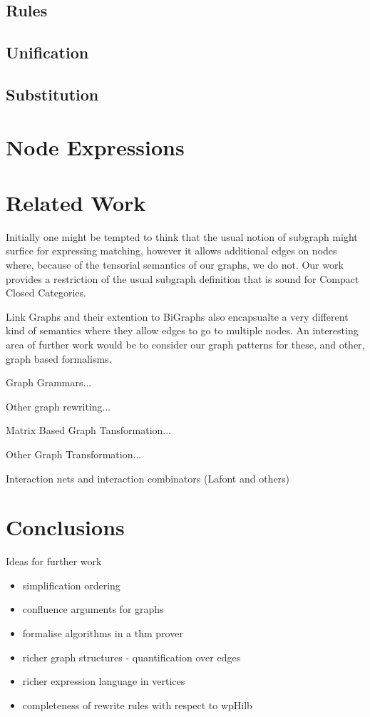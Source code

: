 \documentclass[runningheads]{llncs}
\begin{document}
\subsection{Rules}
\subsection{Unification}
\subsection{Substitution}


\section{Node Expressions}
\label{sec:node-expressions}


\section{Related Work}
\label{sec:relatedwork}

Initially one might be tempted to think that the usual notion of
subgraph might surfice for expressing matching, however it allows
additional edges on nodes where, because of the tensorial semantics of
our graphs, we do not. Our work provides a restriction of the usual
subgraph definition that is sound for Compact Closed Categories.

Link Graphs and their extention to BiGraphs also encapsualte a very
different kind of semantics where they allow edges to go to multiple
nodes. An interesting area of further work would be to consider our
graph patterns for these, and other, graph based formalisms.

Graph Grammars...

Other graph rewriting... 

Matrix Based Graph Tansformation...

Other Graph Transformation...

Interaction nets and interaction combinators (Lafont and others)

\section{Conclusions}
\label{sec:conclusions}

Ideas for further work
\begin{itemize}
\item simplification ordering
\item confluence arguments for graphs
\item formalise algorithms in a thm prover
\item richer graph structures - quantification over edges
\item richer expression language in vertices
\item completeness of rewrite rules with respect to wpHilb
\end{itemize}




\end{document}
